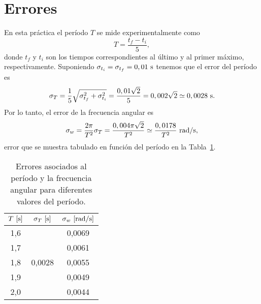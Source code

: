 
\newpage
\section{Errores}

En esta pr\'actica el per\'iodo $T$ se mide experimentalmente como
%
\begin{equation*}
  T = \frac{t_f - t_i}{5},
\end{equation*}
%
donde $t_f$ y $t_i$ son los tiempos correspondientes al \'ultimo y al primer m\'aximo, respectivamente. Suponiendo $\sigma_{t_i} = \sigma_{t_f} = 0,01~{\rm s}$ tenemos que el error del per\'iodo es
%
\begin{equation*}
\sigma_T = \frac{1}{5}\sqrt{\sigma_{t_f}^2 + \sigma_{t_i}^2} = \frac{0,01\sqrt{2}}{5} = 0,002\sqrt{2} \simeq 0,0028~{\rm s}.
\end{equation*}
%
Por lo tanto, el error de la frecuencia angular es
%
\begin{equation*}
\sigma_w = \frac{2\pi}{T^2}\sigma_T = \frac{0,004\pi\sqrt{2}}{T^2} \simeq \frac{0,0178}{T^2}~{\rm rad/s},
\end{equation*}
%
error que se muestra tabulado en funci\'on del per\'iodo en la Tabla~\ref{tabla:errores}.

\begin{table}[h!]
\centering
\begin{tabular}{c | c | c}
\hline
$T~{\rm [s]}$ & $\sigma_T~{\rm [s]}$    & $\sigma_w~{\rm [rad/s]}$ \\
\hline
1,6           & \multirow{5}{*}{0,0028} & 0,0069 \\
1,7           &                         & 0,0061 \\
1,8           &                         & 0,0055 \\
1,9           &                         & 0,0049 \\
2,0           &                         & 0,0044 \\
\hline
\end{tabular}\caption{Errores asociados al per\'iodo y la frecuencia angular para diferentes valores del per\'iodo.}
\label{tabla:errores}
\end{table}
